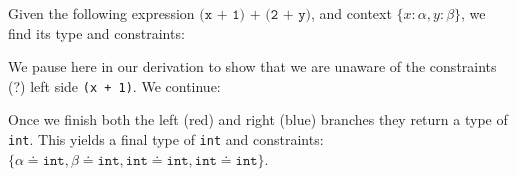     \begin{Example}

        Given the following expression $\texttt{(x + 1) + (2 + y)}$, and context $\{x:\alpha, y: \beta\}$, we find its type and constraints:\\

        \Large
        \normalsize

        \vspace{1em}
        \noindent
        We pause here in our derivation to show that we are unaware of the constraints (?) left side \texttt{(x + 1)}.
        We continue:\\

        \Large
        \normalsize

        \vspace{1em}
        \noindent
        Once we finish both the left (red) and right (blue) branches they return a type of \texttt{int}. This yields a final type of \texttt{int} and constraints:
        $\{\alpha\doteq\texttt{int}, \beta\doteq\texttt{int}, \texttt{int}\doteq\texttt{int}, \texttt{int}\doteq\texttt{int}\}$.
    \end{Example}
\newpage 
